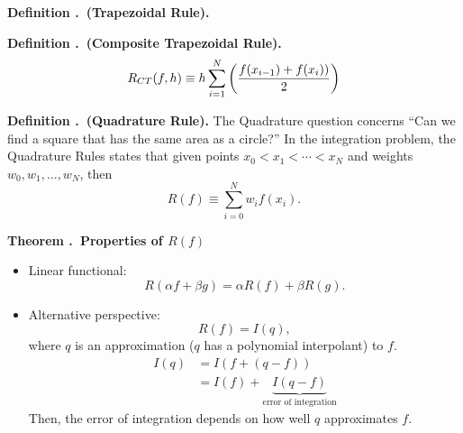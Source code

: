 \documentclass[12pt, a4paper]{article}
\newcounter{index}[subsection]
\newenvironment*{df}[1]{\par\noindent\textbf{Definition \thesubsection.\stepcounter{index}\theindex\ (#1).}}{\par}
\newenvironment*{thm}[1]{\begin{tcolorbox}\par\noindent\textbf{Theorem \thesubsection.\stepcounter{index}\theindex\ #1} \par}{\par\end{tcolorbox}}
\begin{document}
\begin{df}{Trapezoidal Rule}
\begin{center}
	\end{center}
\end{df}
\begin{df}{Composite Trapezoidal Rule}
	\[R_{CT}(f,h)\equiv h\sum_{i=1}^N\qty(\dfrac{f(x_{i-1})+f(x_i))}{2})\]	
\end{df}
\begin{df}{Quadrature Rule}
	The Quadrature question concerns ``Can we find a square that has the same area as a circle?'' In the integration problem, the Quadrature Rules states that given points $x_0<x_1<\cdots<x_N$ and weights $w_0,w_1,\dots,w_N$, then \[R(f)\equiv\sum_{i=0}^N w_if(x_i).\]	
\end{df}
\begin{thm}{Properties of $R(f)$}
	\begin{itemize}
		\item Linear functional: \[R(\alpha f+\beta g)=\alpha R(f)+\beta R(g).\]
		\item Alternative perspective: \[R(f)=I(q),\] where $q$ is an approximation ($q$ has a polynomial interpolant) to $f$. \begin{align*}I(q)&=I(f+(q-f))\\&=I(f)+\underbrace{I(q-f)}_\text{error of integration}\end{align*} Then, the error of integration depends on how well $q$ approximates $f$.
	\end{itemize}	
\end{thm}
\end{document}
